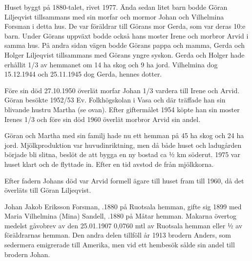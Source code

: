 %
Huset byggt på 1880-talet, rivet 1977. Ända sedan litet barn bodde Göran Liljeqvist tillsammans med sin morfar och mormor Johan och Vilhelmina Forsman i detta hus. De var föräldrar till Görans mor Gerda, som var deras 10:e barn. Under Görans uppväxt bodde också hans moster Irene och morbror Arvid i samma hus. På andra sidan vägen bodde Görans pappa och mamma, Gerda och Holger Liljeqvist tillsammans med Görans yngre syskon. Gerda och Holger hade erhållit 1/3 av hemmanet om 14 ha skog och 9 ha jord. Vilhelmina dog 15.12.1944 och 25.11.1945 dog Gerda, hennes dotter.

Före sin död 27.10.1950 överlät morfar Johan 1/3 vardera till Irene och Arvid. Göran besökte 1952/53 Ev. Folkhögskolan i Vasa och där träffade han sin blivande hustru Martha (se ovan). Efter giftermålet 1954 köpte han sin moster Irenes 1/3 och före sin död 1960 överlät morbror Arvid sin andel.

Göran och Martha med sin familj hade nu ett hemman på 45 ha skog och 24 ha jord. Mjölkproduktion var huvudinriktning, men då både huset och ladugården började bli slitna, beslöt de att bygga en ny bostad ca ½ km söderut. 1975 var huset klart och de flyttade in. Efter en tid avstod de från mjölkkorna.


%
Efter fadern Johans död var Arvid formell ägare till huset fram till 1960, då det överläts till Göran Liljeqvist.\jhvspace{}



%
Johan Jakob Eriksson Forsman, .1880 på Ruotsala hemman, gifte sig 1899 med Maria Vilhelmina (Mina) Sandell, .1880 på Måtar hemman. Makarna övertog medelst gåvobrev av den 25.01.1907  0,0760 mtl av Ruotsala hemman eller ½ av föräldrarnas hemman. Den andra delen tillföll år 1913 brodern Anders, som sedermera emigrerade till Amerika, men vid ett hembesök sålde sin andel till brodern Johan.

